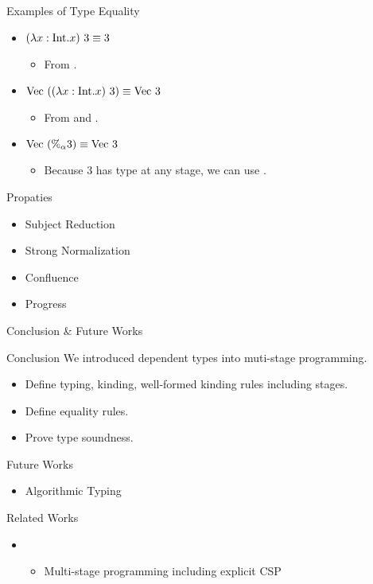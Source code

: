 \documentclass[dvipdfmx,aspectratio=169, 20pt]{beamer}
\begin{document}
\begin{frame}[fragile]{Examples of Type Equality}
    \renewcommand{\V}{\text{Vec}}
    \begin{itemize}
        \item \( (\lambda x:\text{Int}.x)\ 3\equiv 3 \)
            \begin{itemize}
                \item From \QBeta.
            \end{itemize}
        \item \( \V\ ((\lambda x:\text{Int}.x)\ 3) \E \V\ 3 \)
            \begin{itemize}
                \item From \QTApp and \QBeta.
            \end{itemize}
        \item \( \V\ (\%_\alpha 3) \E \V\ 3 \)
            \begin{itemize}
                \item Because \( 3 \) has type  at any stage, we can use \QPercent.
            \end{itemize}
    \end{itemize}
\end{frame}

\begin{frame}[fragile]{Propaties}
    \begin{itemize}
        \item Subject Reduction
        \item Strong Normalization
        \item Confluence
        \item Progress
    \end{itemize}
    \note{
    }
\end{frame}

\begin{frame}[fragile]{Conclusion \& Future Works}
    \begin{block}{Conclusion}
        We introduced dependent types into muti-stage programming.
        \begin{itemize}
            \item Define typing, kinding, well-formed kinding rules including stages.
            \item Define equality rules.
            \item Prove type soundness.
        \end{itemize}
    \end{block}
    \begin{block}{Future Works}
        \begin{itemize}
            \item Algorithmic Typing
        \end{itemize}
    \end{block}
    \note{
    }
\end{frame}

\begin{frame}[fragile]{Related Works}
    \begin{itemize}
        \item {}
            \begin{itemize}
                \item Multi-stage programming including explicit CSP
            \end{itemize}
    \end{itemize}
    \note{
    }
\end{frame}
\end{document}
